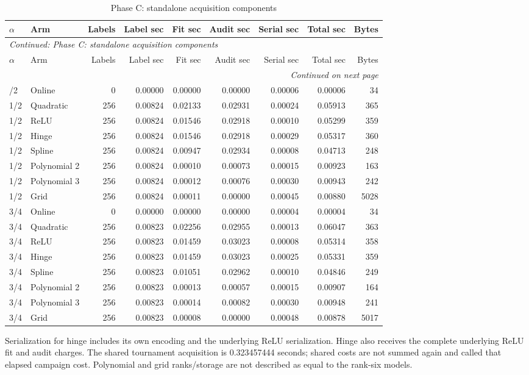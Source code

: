 \begingroup\footnotesize\setlength{\tabcolsep}{3pt}
\begin{longtable}{llrrrrrrr}
\caption{Phase C: standalone acquisition components}\label{tab:acquisition119c}\\
\toprule
$\alpha$ & Arm & Labels & Label sec & Fit sec & Audit sec & Serial sec & Total sec & Bytes\\\midrule
\endfirsthead
\multicolumn{9}{l}{\textit{Continued: Phase C: standalone acquisition components}}\\
\toprule
$\alpha$ & Arm & Labels & Label sec & Fit sec & Audit sec & Serial sec & Total sec & Bytes\\\midrule
\endhead
\midrule\multicolumn{9}{r}{\textit{Continued on next page}}\\
\endfoot
\bottomrule
\endlastfoot
1/2 & Online & 0 & 0.00000 & 0.00000 & 0.00000 & 0.00006 & 0.00006 & 34 \\
1/2 & Quadratic & 256 & 0.00824 & 0.02133 & 0.02931 & 0.00024 & 0.05913 & 365 \\
1/2 & ReLU & 256 & 0.00824 & 0.01546 & 0.02918 & 0.00010 & 0.05299 & 359 \\
1/2 & Hinge & 256 & 0.00824 & 0.01546 & 0.02918 & 0.00029 & 0.05317 & 360 \\
1/2 & Spline & 256 & 0.00824 & 0.00947 & 0.02934 & 0.00008 & 0.04713 & 248 \\
1/2 & Polynomial 2 & 256 & 0.00824 & 0.00010 & 0.00073 & 0.00015 & 0.00923 & 163 \\
1/2 & Polynomial 3 & 256 & 0.00824 & 0.00012 & 0.00076 & 0.00030 & 0.00943 & 242 \\
1/2 & Grid & 256 & 0.00824 & 0.00011 & 0.00000 & 0.00045 & 0.00880 & 5028 \\
3/4 & Online & 0 & 0.00000 & 0.00000 & 0.00000 & 0.00004 & 0.00004 & 34 \\
3/4 & Quadratic & 256 & 0.00823 & 0.02256 & 0.02955 & 0.00013 & 0.06047 & 363 \\
3/4 & ReLU & 256 & 0.00823 & 0.01459 & 0.03023 & 0.00008 & 0.05314 & 358 \\
3/4 & Hinge & 256 & 0.00823 & 0.01459 & 0.03023 & 0.00025 & 0.05331 & 359 \\
3/4 & Spline & 256 & 0.00823 & 0.01051 & 0.02962 & 0.00010 & 0.04846 & 249 \\
3/4 & Polynomial 2 & 256 & 0.00823 & 0.00013 & 0.00057 & 0.00015 & 0.00907 & 164 \\
3/4 & Polynomial 3 & 256 & 0.00823 & 0.00014 & 0.00082 & 0.00030 & 0.00948 & 241 \\
3/4 & Grid & 256 & 0.00823 & 0.00008 & 0.00000 & 0.00048 & 0.00878 & 5017 \\
\end{longtable}
\noindent Serialization for hinge includes its own encoding and the underlying ReLU serialization. Hinge also receives the complete underlying ReLU fit and audit charges. The shared tournament acquisition is 0.323457444 seconds; shared costs are not summed again and called that elapsed campaign cost. Polynomial and grid ranks/storage are not described as equal to the rank-six models.
\endgroup
